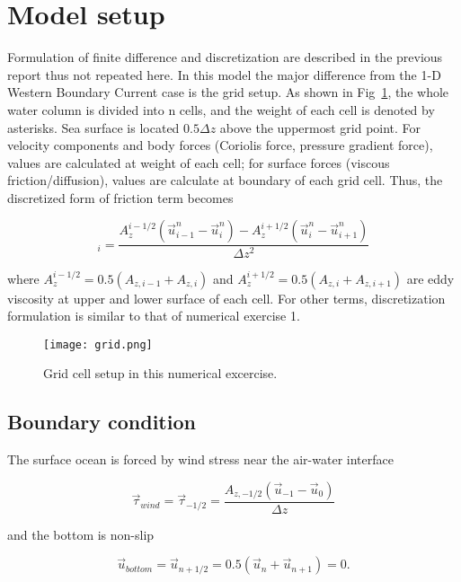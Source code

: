 \documentclass{article}
\begin{document}
\section{Model setup}
Formulation of finite difference and discretization are described in the previous report thus not repeated here. In this model the major difference from the 1-D Western Boundary Current case is the grid setup. As shown in Fig~\ref{fig:grid}, the whole water column is divided into n cells, and the weight of each cell is denoted by asterisks. Sea surface is located $0.5\Delta z$ above the uppermost grid point. For velocity components and body forces (Coriolis force, pressure gradient force), values are calculated at weight of each cell; for surface forces (viscous friction/diffusion), values are calculate at boundary of each grid cell. Thus, the discretized form of friction term becomes

\begin{equation}
[\frac{\partial}{\partial z}(A_z\frac{\partial}{\partial z}\vec{u})]_i=\frac{A_z^{i-1/2}(\vec{u}_{i-1}^n-\vec{u}_i^n)-A_z^{i+1/2}(\vec{u}_i^n-\vec{u}_{i+1}^n)}{\Delta z^2}
\end{equation}

where $A_z^{i-1/2}=0.5(A_{z,i-1}+A_{z,i})$ and $A_z^{i+1/2}=0.5(A_{z,i}+A_{z,i+1})$ are eddy viscosity at upper and lower surface of each cell. For other terms, discretization formulation is similar to that of numerical exercise 1.\\

\begin{figure}
  \centerline{\texttt{[image: grid.png]}}
  \caption{Grid cell setup in this numerical excercise. \citep{kampf2010advanced}}
  \label{fig:grid}
\end{figure}

\subsection{Boundary condition}
The surface ocean is forced by wind stress near the air-water interface

\begin{equation}
\vec{\tau}_{wind}=\vec{\tau}_{-1/2}=\frac{A_{z,-1/2}(\vec{u}_{-1}-\vec{u}_{0})}{\Delta z}
\end{equation}

and the bottom is non-slip

\begin{equation}
\vec{u}_{bottom}=\vec{u}_{n+1/2}=0.5(\vec{u}_n+\vec{u}_{n+1})=0.
\end{equation}
\end{document}
